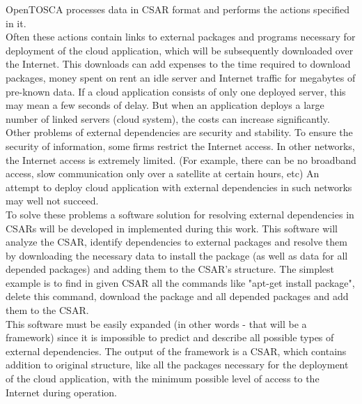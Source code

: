 OpenTOSCA processes data in CSAR format and performs the actions specified in it.\\
Often these actions contain links to external packages and programs necessary for deployment of the cloud application, which will be subsequently downloaded over the Internet.
This downloads can add expenses to the time required to download packages, money spent on rent an idle server and Internet traffic for megabytes of pre-known data.
If a cloud application consists of only one deployed server, this may mean a few seconds of delay. 
But when an application deploys a large number of linked servers (cloud system), the costs can increase significantly.\\
Other problems of external dependencies are security and stability.
To ensure the security of information, some firms restrict the Internet access.
In other networks, the Internet access is extremely limited.
(For example, there can be no broadband access, slow communication only over a satellite at certain hours, etc)
An attempt to deploy cloud application with external dependencies in such networks may well not succeed. \\
To solve these problems a software solution for resolving external dependencies in CSARs will be developed in implemented during this work.
This software will analyze the CSAR, identify dependencies to external packages and resolve them by downloading the necessary data to install the package (as well as data for all depended packages) and adding them to the CSAR's structure.
The simplest example is to find in given CSAR all the commands like "apt-get install package", delete this command, download the package and all depended packages and add them to the CSAR.\\
This software must be easily expanded (in other words - that will be a framework) since it is impossible to predict and describe all possible types of external dependencies.
The output of the framework is a CSAR, which contains addition to original structure, like all the packages necessary for the deployment of the cloud application, with the minimum possible level of access to the Internet during operation.
\clearpage 
